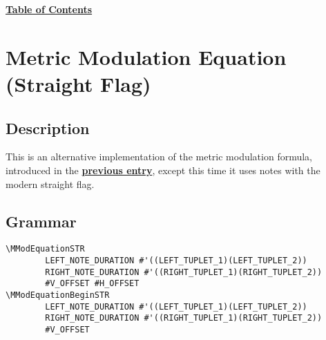 \hyperref[sec:toc]{\textbf{Table of Contents}}

\vfill \break




\section {Metric Modulation Equation (Straight Flag)}

\label{sec:metricModulationStraightFlag}

\subsection{Description}

This is an alternative implementation of the metric modulation formula, introduced in the \hyperref[sec:metricModulationRegularFlag]{\textbf{previous entry}}, except this time it uses notes with the modern straight flag.

\subsection{Grammar}
\begin{verbatim}
\MModEquationSTR 
		LEFT_NOTE_DURATION #'((LEFT_TUPLET_1)(LEFT_TUPLET_2)) 
		RIGHT_NOTE_DURATION #'((RIGHT_TUPLET_1)(RIGHT_TUPLET_2)) 
		#V_OFFSET #H_OFFSET
\MModEquationBeginSTR 
		LEFT_NOTE_DURATION #'((LEFT_TUPLET_1)(LEFT_TUPLET_2)) 
		RIGHT_NOTE_DURATION #'((RIGHT_TUPLET_1)(RIGHT_TUPLET_2)) 
		#V_OFFSET
\end{verbatim}

